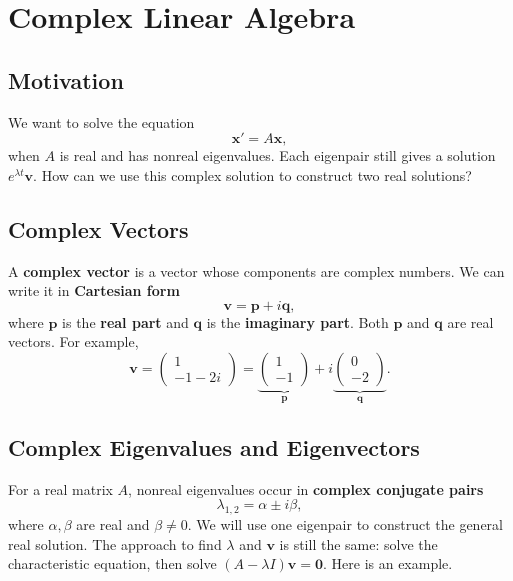 \documentclass[11pt,letterpaper]{article}
\begin{document}

\section{Complex Linear Algebra}

\subsection{Motivation}
We want to solve the equation
$$
\textbf{x}'=A\textbf{x}, 
$$
when $A$ is real and has nonreal eigenvalues.
Each eigenpair still gives a solution $e^{\lambda t}\mathbf{v}$. How can we use this complex solution to construct two real solutions?


\subsection{Complex Vectors}

A \textbf{complex vector} is a vector whose components are complex
numbers. We can write it in \textbf{Cartesian form}
\[
    \boxed{\mathbf{v}=\mathbf{p}+i\mathbf{q},}
\]
where $\mathbf{p}$ is the \textbf{real part} and $\mathbf{q}$ is the
\textbf{imaginary part}. Both $\mathbf{p}$ and $\mathbf{q}$ are real
vectors. For example,
\[
    \mathbf{v}
    =\begin{pmatrix}1\\-1-2i\end{pmatrix}
    =
    \underbrace{\begin{pmatrix}1\\-1\end{pmatrix}}_{\mathbf{p}}
    +i\underbrace{\begin{pmatrix}0\\-2\end{pmatrix}}_{\mathbf{q}}.
\]


\subsection{Complex Eigenvalues and Eigenvectors}

For a real matrix $A$, nonreal eigenvalues occur in \textbf{complex conjugate pairs}
$$
    \lambda_{1,2} = \alpha \pm i\beta,
$$
where $\alpha,\beta$ are real and $\beta\ne0$. We will use one eigenpair to construct the general real solution.
The approach to find $\lambda$ and $\textbf{v}$ is still the same:
solve the characteristic equation, then solve
$(A-\lambda I)\mathbf{v}=\mathbf{0}$. Here is an example.
\end{document}
